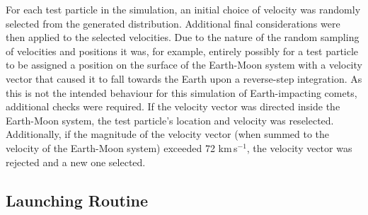 


For each test particle in the simulation, an initial choice of velocity was randomly selected from the generated distribution. Additional final considerations were then applied to the selected velocities. Due to the nature of the random sampling of velocities and positions it was, for example, entirely possibly for a test particle to be assigned a position on the surface of the Earth-Moon system with a velocity vector that caused it to fall towards the Earth upon a reverse-step integration. As this is not the intended behaviour for this simulation of Earth-impacting comets, additional checks were required. If the velocity vector was directed inside the Earth-Moon system, the test particle's location and velocity was reselected. Additionally, if the magnitude of the velocity vector (when summed to the velocity of the Earth-Moon system) exceeded 72 km$\,$s$^{-1}$, the velocity vector was rejected and a new one selected.

\clearpage
\subsection{Launching Routine}

